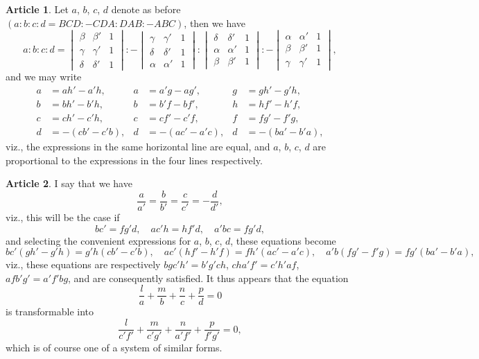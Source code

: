 \documentclass[11pt,a4paper]{article}
\theoremstyle{definition}
\newtheorem{art}{Article}
\begin{document}
\begin{art}
Let $a$, $b$, $c$, $d$ denote as before $(a : b : c : d = BCD : -CDA : DAB : -ABC)$, then we have
\[
a : b : c : d = \begin{vmatrix} \beta & \beta' & 1 \\ \gamma & \gamma' & 1 \\ \delta & \delta' & 1 \end{vmatrix} : -\begin{vmatrix} \gamma & \gamma' & 1 \\ \delta & \delta' & 1 \\ \alpha & \alpha' & 1 \end{vmatrix} : \begin{vmatrix} \delta & \delta' & 1 \\ \alpha & \alpha' & 1 \\ \beta & \beta' & 1 \end{vmatrix} : -\begin{vmatrix} \alpha & \alpha' & 1 \\ \beta & \beta' & 1 \\ \gamma & \gamma' & 1 \end{vmatrix},
\]
and we may write
\begin{align*}
a &= ah' - a'h, & a &= a'g - ag', & g &= gh' - g'h, \\
b &= bh' - b'h, & b &= b'f - bf', & h &= hf' - h'f, \\
c &= ch' - c'h, & c &= cf' - c'f, & f &= fg' - f'g, \\
d &= -(cb' - c'b), & d &= -(ac' - a'c), & d &= -(ba' - b'a),
\end{align*}
viz., the expressions in the same horizontal line are equal, and $a$, $b$, $c$, $d$ are proportional to the expressions in the four lines respectively.
\end{art}

\begin{art}
I say that we have
\[
\frac{a}{a'} = \frac{b}{b'} = \frac{c}{c'} = -\frac{d}{d'},
\]
viz., this will be the case if
\[
bc' = fg'd, \quad ac'h = hf'd, \quad a'bc = fg'd,
\]
and selecting the convenient expressions for $a$, $b$, $c$, $d$, these equations become
\[
bc'(gh' - g'h) = g'h(cb' - c'b), \quad ac'(hf' - h'f) = fh'(ac' - a'c), \quad a'b(fg' - f'g) = fg'(ba' - b'a),
\]
viz., these equations are respectively $bgc'h' = b'g'ch$, $cha'f' = c'h'af$, $afb'g' = a'f'bg$, and are consequently satisfied. It thus appears that the equation
\[
\frac{l}{a} + \frac{m}{b} + \frac{n}{c} + \frac{p}{d} = 0
\]
is transformable into
\[
\frac{l}{c'f'} + \frac{m}{c'g'} + \frac{n}{a'f'} + \frac{p}{f'g'} = 0,
\]
which is of course one of a system of similar forms.
\end{art}
\end{document}
